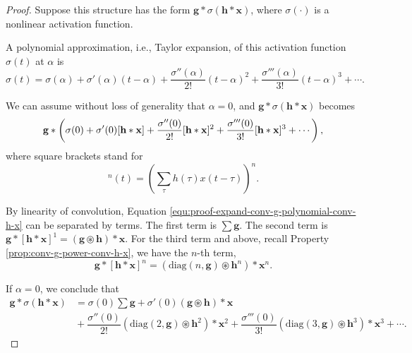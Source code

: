 \documentclass[twoside,11pt]{article}
\def\oconv{\circledast}
\def\diag{\text{diag}}
\def\tvar#1{\mathbf{#1}} %
\begin{document}
\begin{proof}
  Suppose this structure has the form \(\tvar{g} * \sigma(\tvar{h} * \tvar{x})\), where \(\sigma(\cdot)\) is a nonlinear activation function.

  A polynomial approximation, i.e., Taylor expansion, of this activation function \(\sigma(t)\) at \(\alpha\) is
  \begin{equation*}
    \sigma(t) = \sigma(\alpha) + \sigma'(\alpha) (t - \alpha) + \dfrac{\sigma''(\alpha)}{2!} (t - \alpha)^2 + \dfrac{\sigma'''(\alpha)}{3!} (t - \alpha)^3 + \cdots.
  \end{equation*}

  We can assume without loss of generality that \(\alpha = 0\), and \(\tvar{g} * \sigma(\tvar{h} * \tvar{x})\) becomes
  \begin{equation}
    \tvar{g} * \left(
    \sigma(0) + \sigma'(0) [\tvar{h} * \tvar{x}] +
    \dfrac{\sigma''(0)}{2!} [\tvar{h} * \tvar{x}]^2                \\
    + \dfrac{\sigma'''(0)}{3!} [\tvar{h} * \tvar{x}]^3 + \cdots
    \right),
    \label{equ:proof-expand-conv-g-polynomial-conv-h-x}
  \end{equation}
  where square brackets stand for
  \begin{equation*}
    [\tvar{h} * \tvar{x}]^n(t) = \left( \sum_{\tau} h(\tau) x(t - \tau) \right)^n.
  \end{equation*}

  By linearity of convolution, Equation \ref{equ:proof-expand-conv-g-polynomial-conv-h-x} can be separated by terms.
  The first term is \(\sum \tvar{g}\).
  The second term is \(\tvar{g} * [\tvar{h} * \tvar{x}]^1 = \left(\tvar{g} \oconv \tvar{h}\right) * \tvar{x}\).
  For the third term and above, recall Property \ref{prop:conv-g-power-conv-h-x}, we have the \(n\)-th term,
  \begin{equation*}
    \tvar{g} * [\tvar{h} * \tvar{x}]^n
    = \left(\diag(n, \tvar{g}) \oconv \tvar{h}^n \right) * \tvar{x}^n.
  \end{equation*}

  If \(\alpha = 0\), we conclude that
  \begin{equation}
    \begin{aligned}
      \tvar{g} * \sigma(\tvar{h} * \tvar{x})
       & = \sigma(0) \sum \tvar{g}
      + \sigma'(0) (\tvar{g} \oconv \tvar{h}) * \tvar{x} \\
       & \!\!
      + \dfrac{\sigma''(0)}{2!} (\diag(2, \tvar{g}) \oconv \tvar{h}^2) * \tvar{x}^2
      + \dfrac{\sigma'''(0)}{3!} (\diag(3, \tvar{g}) \oconv \tvar{h}^3) * \tvar{x}^3
      + \cdots.
    \end{aligned}
    \label{equ:conv-act-conv-to-vconv-expand}
  \end{equation}


\end{proof}
\end{document}

